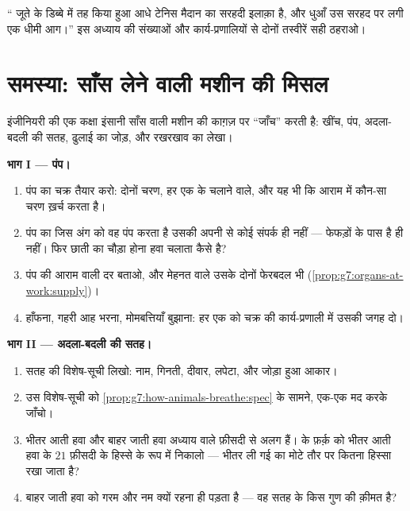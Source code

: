 \begin{exercise}[$\star\star\star$]\label{exo:g7:lungs-and-gas-exchange:12}
`` जूते के डिब्बे में तह किया हुआ आधे टेनिस मैदान का सरहदी इलाक़ा
है, और धुआँ उस सरहद पर लगी एक धीमी आग।'' इस अध्याय की संख्याओं और
कार्य-प्रणालियों से दोनों तस्वीरें सही ठहराओ।
\end{exercise}

\section{समस्या: साँस लेने वाली मशीन की मिसल}

\begin{problem}[{सप्ताहांत समस्या --- इंसानी धौंकनी की एक इंजीनियर वाली
जाँच}]\label{pb:g7:lungs-and-gas-exchange:1}
इंजीनियरी की एक कक्षा इंसानी साँस वाली मशीन की काग़ज़ पर ``जाँच'' करती
है: खींच, पंप, अदला-बदली की सतह, ढुलाई का जोड़, और रखरखाव का लेखा।

\medskip\noindent\textbf{भाग I --- पंप।}
\begin{enumerate}
  \item पंप का चक्र तैयार करो: दोनों चरण, हर एक के चलाने वाले, और यह
        भी कि आराम में कौन-सा चरण  ख़र्च करता है।
  \item पंप का जिस अंग को वह पंप करता है उसकी अपनी  से कोई
        संपर्क ही नहीं --- फेफड़ों के पास  है ही नहीं। फिर छाती
        का चौड़ा होना हवा चलाता कैसे है?
  \item पंप की आराम वाली दर बताओ, और मेहनत वाले उसके दोनों फेरबदल भी
        (\cref{prop:g7:organs-at-work:supply})।
  \item हाँफना, गहरी आह भरना, मोमबत्तियाँ बुझाना: हर एक को चक्र की
        कार्य-प्रणाली में उसकी जगह दो।
\end{enumerate}

\medskip\noindent\textbf{भाग II --- अदला-बदली की सतह।}
\begin{enumerate}[resume]
  \item सतह की विशेष-सूची लिखो: नाम, गिनती, दीवार, लपेटा, और जोड़ा
        हुआ आकार।
  \item उस विशेष-सूची को \cref{prop:g7:how-animals-breathe:spec} के
        सामने, एक-एक मद करके जाँचो।
  \item भीतर आती हवा और बाहर जाती हवा अध्याय वाले फ़ीसदी से अलग हैं।
         के फ़र्क़ को भीतर आती हवा के $21$ फ़ीसदी के हिस्से के
        रूप में निकालो --- भीतर ली गई  का मोटे तौर पर कितना
        हिस्सा रखा जाता है?
  \item बाहर जाती हवा को गरम और नम क्यों रहना ही पड़ता है --- वह सतह
        के किस गुण की क़ीमत है?
\end{enumerate}


\end{problem}
